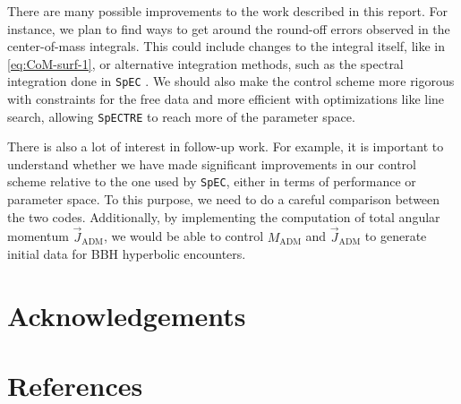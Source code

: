 \documentclass{../document}
\begin{document}
    There are many possible improvements to the work described in this report. For instance, we plan to find ways to get around the round-off errors observed in the center-of-mass integrals. This could include changes to the integral itself, like in \eq\eqref{eq:CoM-surf-1}, or alternative integration methods, such as the spectral integration done in {\tt SpEC} \cite{Serguei}. We should also make the control scheme more rigorous with constraints for the free data and more efficient with optimizations like line search, allowing {\tt SpECTRE} to reach more of the parameter space.

    There is also a lot of interest in follow-up work. For example, it is important to understand whether we have made significant improvements in our control scheme relative to the one used by {\tt SpEC}, either in terms of performance or parameter space. To this purpose, we need to do a careful comparison between the two codes. Additionally, by implementing the computation of total angular momentum $\vec J_\text{ADM}$, we would be able to control $M_\text{ADM}$ and $\vec J_\text{ADM}$ to generate initial data for BBH hyperbolic encounters.

  \section*{Acknowledgements}


  \section*{References}

	  \printbibliography[heading=none]
  
\end{document}
